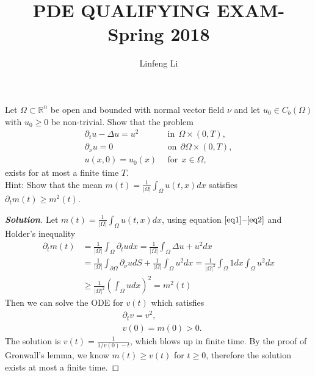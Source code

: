 \documentclass[11pt,reqno]{amsart}
\newcommand{\R}{\mathbb{R}}
\newcommand{\<}{\langle}
\renewcommand{\>}{\rangle}
\newcommand{\norm}[1]{\vert#1\vert}
\begin{document}
\title{\Large{PDE QUALIFYING EXAM-Spring 2018\\ }}
\author{Linfeng Li}
\maketitle





\begin{enumerate}[label={\arabic*.}]
\begin{tcolorbox}
\item Let $\Omega \subset \R^n$ be open and bounded with normal vector field $\nu$ and let $u_0 \in C_b (\Omega)$ with $u_0\geq 0$ be non-trivial. Show that the problem
\begin{align}
\partial_t u -\Delta u = u^2 \label{eq1} \ \ & \text{in}\ \ \Omega \times (0,T),\\
\partial_{\nu} u = 0 \label{eq2}\ \ & \text{on} \ \ \partial\Omega \times (0,T),\\
u(x, 0) = u_0(x) \label{eq3}\ \ & \text{for} \ \ x\in \Omega,
\end{align}
exists for at most a finite time $T$.\\
Hint: Show that the mean $m(t) = \frac{1}{\norm{\Omega}} \int_\Omega u(t,x) dx$ satisfies $\partial_t m(t) \geq m^2(t)$.
\end{tcolorbox}
\bigskip


\begin{proof}[\bf{Solution}]
Let $m(t) = \frac{1}{\norm{\Omega}}\int_{\Omega} u(t,x) dx$, using equation $\eqref{eq1}$--$\eqref{eq2}$ and Holder's inequality
\begin{align*}
\partial_t m(t) 
&
= \frac{1}{\norm{\Omega}} \int_{\Omega} \partial_t u dx = \frac{1}{\norm{\Omega}} \int_{\Omega} \Delta u + u^2 dx\\
&
= \frac{1}{\norm{\Omega}} \int_{\partial \Omega} \partial_\nu u dS + \frac{1}{\norm{\Omega}} \int_{\Omega} u^2 dx = \frac{1}{\norm{\Omega}^2} \int_{\Omega} 1 dx \int_{\Omega} u^2 dx\\ 
&
\geq \frac{1}{\norm{\Omega}^2} (\int_{\Omega} u dx)^2 =m^2(t)
\end{align*}
Then we can solve the ODE for $v(t)$ which satisfies
\begin{align*}
&\partial_t v = v^2,\\
& v(0) = m(0) > 0.
\end{align*}
The solution is $v(t) = \frac{1}{1/v(0) -t}$, which blows up in finite time. By the proof of Gronwall's lemma, we know $m(t) \geq v(t)$ for $t\geq 0$, therefore the solution exists at most a finite time.
\end{proof}




\end{enumerate}
\end{document}
